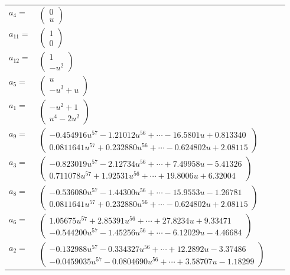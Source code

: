\documentclass[1p]{elsarticle_modified}
\theoremstyle{definition}
\begin{document}
\begin{tabular}{m{7pt} m{180pt} m{7pt} m{180pt} }
\flushright $a_{4}=$&$\begin{pmatrix}0\\u\end{pmatrix}$ \\
\flushright $a_{11}=$&$\begin{pmatrix}1\\0\end{pmatrix}$ \\
\flushright $a_{12}=$&$\begin{pmatrix}1\\- u^2\end{pmatrix}$ \\
\flushright $a_{5}=$&$\begin{pmatrix}u\\- u^3+u\end{pmatrix}$ \\
\flushright $a_{1}=$&$\begin{pmatrix}- u^2+1\\u^4-2 u^2\end{pmatrix}$ \\
\flushright $a_{9}=$&$\begin{pmatrix}-0.454916 u^{57}-1.21012 u^{56}+\cdots-16.5801 u+0.813340\\0.0811641 u^{57}+0.232880 u^{56}+\cdots-0.624802 u+2.08115\end{pmatrix}$ \\
\flushright $a_{3}=$&$\begin{pmatrix}-0.823019 u^{57}-2.12734 u^{56}+\cdots+7.49958 u-5.41326\\0.711078 u^{57}+1.92531 u^{56}+\cdots+19.8006 u+6.32004\end{pmatrix}$ \\
\flushright $a_{8}=$&$\begin{pmatrix}-0.536080 u^{57}-1.44300 u^{56}+\cdots-15.9553 u-1.26781\\0.0811641 u^{57}+0.232880 u^{56}+\cdots-0.624802 u+2.08115\end{pmatrix}$ \\
\flushright $a_{6}=$&$\begin{pmatrix}1.05675 u^{57}+2.85391 u^{56}+\cdots+27.8234 u+9.33471\\-0.544200 u^{57}-1.45256 u^{56}+\cdots-6.12029 u-4.46684\end{pmatrix}$ \\
\flushright $a_{2}=$&$\begin{pmatrix}-0.132988 u^{57}-0.334327 u^{56}+\cdots+12.2892 u-3.37486\\-0.0459035 u^{57}-0.0804690 u^{56}+\cdots+3.58707 u-1.18299\end{pmatrix}$ \\

\end{tabular}
\end{document}
